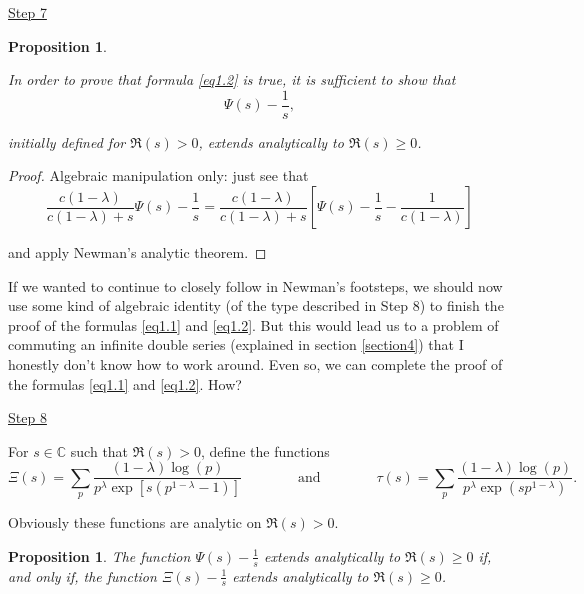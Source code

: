 \documentclass[11pt]{amsart}
\newtheorem{proposition}[theorem]{Proposition}
\numberwithin{equation}{section}
\newcommand{\C}{\mathbb{C}}
\newcommand{\disum}{\displaystyle \sum}
\newcommand{\difrac}{\displaystyle \frac}
\begin{document}
\begin{center} \underline{Step 7} \end{center}

\begin{proposition} \label{firsttweak}

In order to prove that formula \ref{eq1.2} is true, it is sufficient to show that $$\Psi(s) - \difrac{1}{s},$$

\noindent initially defined for $\Re(s) > 0$, extends analytically to $\Re(s) \geq 0$.

\end{proposition}

\begin{proof} Algebraic manipulation only: just see that $$\difrac{c(1 - \lambda)}{c(1 - \lambda) + s}\Psi(s) - \difrac{1}{s} = \difrac{c(1 - \lambda)}{c(1 - \lambda) + s}\left[\Psi(s) - \difrac{1}{s} - \difrac{1}{c(1 - \lambda)}\right]$$

\noindent and apply Newman's analytic theorem. \end{proof}

If we wanted to continue to closely follow in Newman's footsteps, we should now use some kind of algebraic identity (of the type described in Step $8$) to finish the proof of the formulas \ref{eq1.1} and \ref{eq1.2}. But this would lead us to a problem of commuting an infinite double series (explained in section \ref{section4}) that I honestly don't know how to work around. Even so, we can complete the proof of the formulas \ref{eq1.1} and \ref{eq1.2}. How?

\begin{center} \underline{Step 8} \end{center}

For $s \in \C$ such that $\Re(s) > 0$, define the functions $$\Xi(s) = \disum_p \difrac{(1 - \lambda) \log(p)}{p^\lambda \exp[s(p^{1 - \lambda} - 1)]} \qquad \qquad \text{and} \qquad \qquad \tau(s) = \disum_p \difrac{(1 - \lambda) \log(p)}{p^\lambda \exp(sp^{1 - \lambda})}.$$

Obviously these functions are analytic on $\Re(s) > 0$.

\begin{proposition}

The function $\Psi(s) - \difrac{1}{s}$ extends analytically to $\Re(s) \geq 0$ if, and only if, the function $\Xi(s) - \difrac{1}{s}$ extends analytically to $\Re(s) \geq 0$.

\end{proposition}
\end{document}
